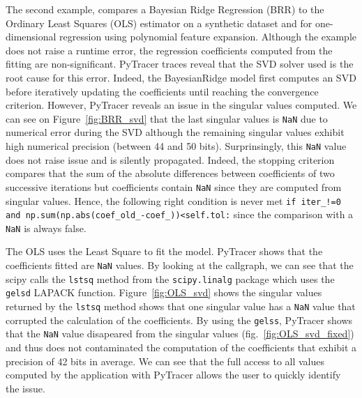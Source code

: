 \documentclass[10pt,journal,compsoc]{IEEEtran}
\newcommand{\pytracer}[0]{PyTracer\xspace}
\DeclareRobustCommand{\add}[1]{#1}
\begin{document}
The second example, compares a Bayesian Ridge Regression (BRR) to the Ordinary
Least Squares (OLS) estimator on a synthetic dataset and for one-dimensional
regression using polynomial feature expansion. Although the example does not
raise a runtime error, the regression coefficients computed from the fitting are
non-significant. \pytracer traces reveal that the SVD solver used is the root
cause for this error. \add{Indeed, the BayesianRidge model first computes an SVD
    before iteratively updating the coefficients until reaching the convergence
    criterion. However, PyTracer reveals an issue in the singular values computed.}
\add{We can see on Figure}~\ref{fig:BRR_svd} \add{that the last singular values is
    \texttt{NaN} due to numerical error during the SVD although the remaining
    singular values exhibit high numerical precision (between 44 and 50 bits).
    Surprinsingly, this \texttt{NaN} value does not raise issue and is silently
    propagated. Indeed, the stopping criterion compares that the sum of the absolute
    differences between coefficients of two successive iterations but coefficients
    contain \texttt{NaN} since they are computed from singular values. Hence, the
    following right condition is never met \texttt{if iter\_!=0 and np.sum(np.abs(coef\_old\_-coef\_))<self.tol:} since the comparison with a
    \texttt{NaN} is always false.}


\add{The OLS uses the Least Square to fit the model. PyTracer shows that the
    coefficients fitted are \texttt{NaN} values. By looking at the callgraph, we can
    see that the scipy calls the \texttt{lstsq} method from the
    \texttt{scipy.linalg} package which uses the \texttt{gelsd} LAPACK function.
    Figure}~\ref{fig:OLS_svd} \add{shows the singular values returned by the
    \texttt{lstsq} method shows that one singular value has a \texttt{NaN} value
    that corrupted the calculation of the coefficients. By using the \texttt{gelss},
    PyTracer shows that the \texttt{NaN} value disapeared from the singular values
    (fig.}~\ref{fig:OLS_svd_fixed}\add{) and thus does not contaminated the computation of
    the coefficients that exhibit a precision of 42 bits in average. We can see that
    the full access to all values computed by the application with PyTracer allows
    the user to quickly identify the issue.}
\end{document}
